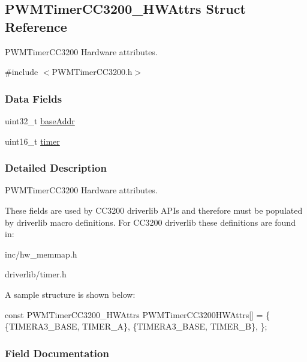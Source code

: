\subsection{P\+W\+M\+Timer\+C\+C3200\+\_\+\+H\+W\+Attrs Struct Reference}
\label{struct_p_w_m_timer_c_c3200___h_w_attrs}


P\+W\+M\+Timer\+C\+C3200 Hardware attributes.  




{\ttfamily \#include $<$P\+W\+M\+Timer\+C\+C3200.\+h$>$}

\subsubsection*{Data Fields}
\begin{DoxyCompactItemize}
\item 
uint32\+\_\+t \hyperlink{struct_p_w_m_timer_c_c3200___h_w_attrs_a2cc366b46e3f710f761ad990afa1aea0}{base\+Addr}
\item 
uint16\+\_\+t \hyperlink{struct_p_w_m_timer_c_c3200___h_w_attrs_aa25fe5589d4a5c924759293c334fb40d}{timer}
\end{DoxyCompactItemize}


\subsubsection{Detailed Description}
P\+W\+M\+Timer\+C\+C3200 Hardware attributes. 

These fields are used by C\+C3200 driverlib A\+P\+Is and therefore must be populated by driverlib macro definitions. For C\+C3200 driverlib these definitions are found in\+:
\begin{DoxyItemize}
\item inc/hw\+\_\+memmap.\+h
\item driverlib/timer.\+h
\end{DoxyItemize}

A sample structure is shown below\+: 
\begin{DoxyCode}
\textcolor{keyword}{const} PWMTimerCC3200_HWAttrs PWMTimerCC3200HWAttrs[] = \{
    \{TIMERA3\_BASE, TIMER\_A\},
    \{TIMERA3\_BASE, TIMER\_B\},
\};
\end{DoxyCode}
 

\subsubsection{Field Documentation}
